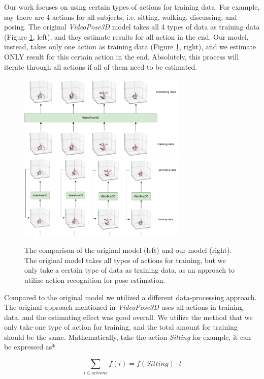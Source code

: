 \documentclass[10pt,twocolumn,letterpaper]{article}
\begin{document}
Our work focuses on using certain types of actions for training data. For example, say there are 4 actions for all
subjects, i.e. sitting, walking, discussing, and posing. The original \textit{VideoPose3D} model takes all 4 types
of data as training data (Figure \ref{fig:model_comparison}, left), and they estimate results for all action in the end. Our model, instead, takes 
only one action as training data (Figure \ref{fig:model_comparison}, right), and we estimate ONLY result for this certain action in the end. Absolutely, this
process will iterate through all actions if all of them need to be estimated.

\begin{figure}
\centering
\includegraphics[width=8cm]{model.png}
\includegraphics[width=8cm]{new_model.png}
\caption{The comparison of the original model (left) and our model (right). The original model takes all types of actions for 
		 training, but we only take a certain type of data as training data, as an approach to utilize action recognition for pose estimation.}
\label{fig:model_comparison}
\end{figure}

Compared to the original model we utilized a different data-processing approach. The original approach
mentioned in \textit{VideoPose3D} uses all actions in training data, and the estimating effect was good
overall. We utilize the method that we only take one type of action for training, and the total amount 
for training should be the same. Mathematically, take the action \textit{Sitting} for example, it can 
be expressed as*

\begin{equation}
	\sum_{i\in actions}{f(i)} = f(Sitting)\cdot t
\end{equation}
\end{document}
